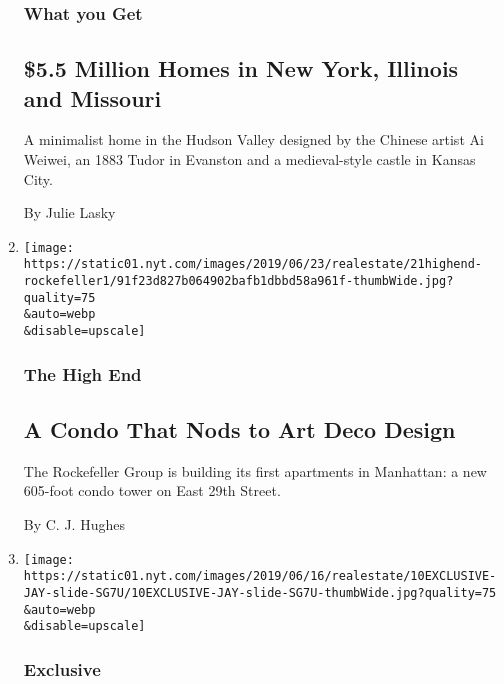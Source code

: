 \begin{enumerate}
  \hypertarget{what-you-get}{%
  \subsubsection{What you Get}\label{what-you-get}}

  \hypertarget{55-million-homes-in-new-york-illinois-and-missouri}{%
  \subsection{\$5.5 Million Homes in New York, Illinois and
  Missouri}\label{55-million-homes-in-new-york-illinois-and-missouri}}

  A minimalist home in the Hudson Valley designed by the Chinese artist
  Ai Weiwei, an 1883 Tudor in Evanston and a medieval-style castle in
  Kansas City.

  By Julie Lasky
\item
  \href{/2019/06/21/realestate/a-condo-that-nods-to-art-deco-design.html}{}

  \texttt{[image: https://static01.nyt.com/images/2019/06/23/realestate/21highend-rockefeller1/91f23d827b064902bafb1dbbd58a961f-thumbWide.jpg?quality=75\\\&auto=webp\\\&disable=upscale]}

  \hypertarget{the-high-end-8}{%
  \subsubsection{The High End}\label{the-high-end-8}}

  \hypertarget{a-condo-that-nods-to-art-deco-design}{%
  \subsection{A Condo That Nods to Art Deco
  Design}\label{a-condo-that-nods-to-art-deco-design}}

  The Rockefeller Group is building its first apartments in Manhattan: a
  new 605-foot condo tower on East 29th Street.

  By C. J. Hughes
\item
  \href{/2019/06/11/realestate/tribeca-penthouse-that-defies-limitations.html}{}

  \texttt{[image: https://static01.nyt.com/images/2019/06/16/realestate/10EXCLUSIVE-JAY-slide-SG7U/10EXCLUSIVE-JAY-slide-SG7U-thumbWide.jpg?quality=75\\\&auto=webp\\\&disable=upscale]}

  \hypertarget{exclusive}{%
  \subsubsection{Exclusive}\label{exclusive}}


\end{enumerate}
